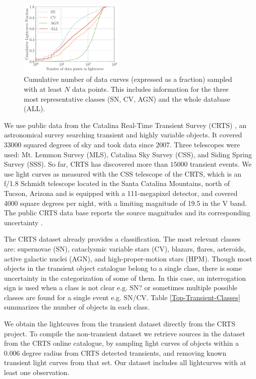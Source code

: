 \documentclass[a4paper,fleqn,usenatbib]{mnras}
\begin{document}
\begin{figure}
  \includegraphics[width=0.45\textwidth]{cumulative_classes.pdf}
  \caption{Cumulative number of data curves (expressed as a fraction)
    sampled with at least $N$ data points. This includes information
    for the three most representative classes (SN, CV, AGN) and the
    whole database (ALL).}
  \label{fig:cumulative}
\end{figure} 

We use public data from the Catalina Real-Time Transient Survey
(CRTS) \citep{1111.2566}, an astronomical survey searching transient
and highly variable objects.   
It covered 33000 squared degrees of sky and took data since 2007.
Three telescopes were used: Mt. Lemmon Survey (MLS), Catalina Sky
Survey (CSS), and Siding Spring Survey (SSS). So far, CRTS has
discovered more than $15000$ transient events.
We use light curves as measured with the CSS telescope of the CRTS, which is
an f/1.8 Schmidt telescope located in the Santa Catalina Mountains, north of Tucson,
Arizona and is equipped with a 111-megapixel  detector, and covered
4000 square degrees per night, with a limiting magnitude of 19.5 in
the V band.  
The public CRTS data base reports the source magnitudes and its
corresponding uncertainty \citep{1996PASP..108..851S}.


The CRTS dataset already provides a classification. 
The most relevant classes are: supernovae (SN),
cataclysmic variable stars (CV), blazars, flares, asteroids, active
galactic nuclei (AGN), and high-proper-motion stars (HPM). 
Though most objects in the transient object catalogue belong to a single class,
there is some uncertainty in the categorization of some of
them. 
In this case, an interrogation sign is used when a class is not clear
e.g. SN? or sometimes multiple possible classes are found for a single
event e.g. SN/CV.
Table \ref{Top-Transient-Classes} summarizes the number of objects in
each class. 

We obtain the lightcuves from the transient dataset directly from
the CRTS project. 
To compile the non-transient dataset we retrieve sources in the
dataset from the CRTS online catalogue, by sampling light curves of
objects within a 0.006  degree radius from CRTS detected transients,
and removing known transient light curves from that set. 
Our dataset includes all lightcurves with at least one observation. 
\end{document}
